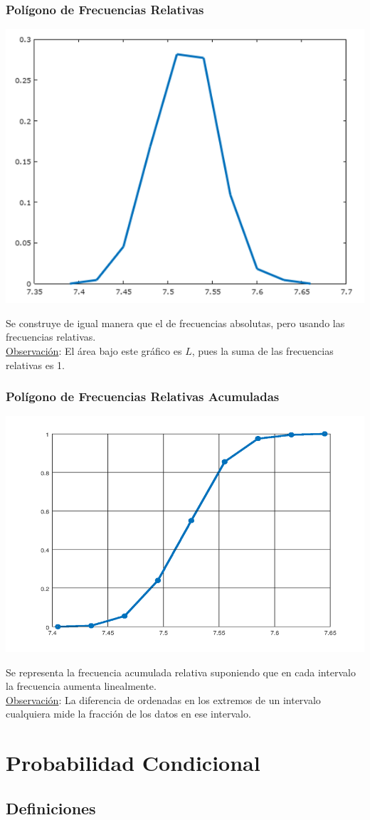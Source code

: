\documentclass{article}
\begin{document}
\subsubsection{Polígono de Frecuencias Relativas}
    \begin{center}
        \includegraphics[width=.40\textwidth]{Images/PoligonoFRel.png}
    \end{center}
    Se construye de igual manera que el de frecuencias absolutas, pero usando las frecuencias relativas.
    \\\underline{Observación}: El área bajo este gráfico es $L$, pues la suma de las frecuencias relativas es 1.
\subsubsection{Polígono de Frecuencias Relativas Acumuladas}
    \begin{center}
        \includegraphics[width=.40\textwidth]{Images/PoligonoFRelAcumuladas.png}
    \end{center}
     Se representa la frecuencia acumulada relativa suponiendo que en cada intervalo la frecuencia aumenta linealmente.
     \\\underline{Observación}: La diferencia de ordenadas en los extremos de un intervalo cualquiera mide la fracción de los datos en ese intervalo.
     
\newpage
\section{Probabilidad Condicional}  
\subsection{Definiciones}
\end{document}
